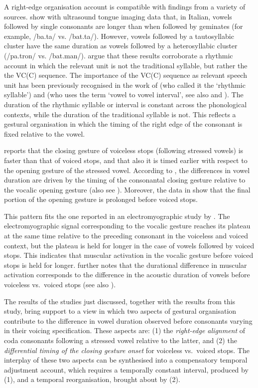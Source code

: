 \documentclass[preprint]{JASAnew}
\begin{document}
A right-edge organisation account is compatible with findings from a
variety of sources. \citet{celata2018} show with ultrasound tongue
imaging data that, in Italian, vowels followed by single consonants are
longer than when followed by geminates (for example, /ba.ta/ vs.
/bat.ta/). However, vowels followed by a tautosyllabic cluster have the
same duration as vowels followed by a heterosyllabic cluster (/pa.tron/
vs. /bat.man/). \citet{celata2018} argue that these results corroborate
a rhythmic account in which the relevant unit is not the traditional
syllable, but rather the the VC(C) sequence. The importance of the VC(C)
sequence as relevant speech unit has been previously recognised in the
work of \citet{farnetani1986} (who called it the `rhythmic syllable')
and \citet{steriade2012} (who uses the term `vowel to vowel interval',
see also \citealt{hirsch2014} and \citealt{lunden2017}). The duration of
the rhythmic syllable or interval is constant across the phonological
contexts, while the duration of the traditional syllable is not. This
reflects a gestural organisation in which the timing of the right edge
of the consonant is fixed relative to the vowel.

\citet{de-jong1991} reports that the closing gesture of voiceless stops
(following stressed vowels) is faster than that of voiced stops, and
that also it is timed earlier with respect to the opening gesture of the
stressed vowel. According to \citet{de-jong1991}, the differences in
vowel duration are driven by the timing of the consonantal closing
gesture relative to the vocalic opening gesture (also see
\citealt{hertrich1997}). Moreover, the data in \citet{de-jong1991} show
that the final portion of the opening gesture is prolonged before voiced
stops.

This pattern fits the one reported in an electromyographic study by
\citet{raphael1975}. The electromyographic signal corresponding to the
vocalic gesture reaches its plateau at the same time relative to the
preceding consonant in the voiceless and voiced context, but the plateau
is held for longer in the case of vowels followed by voiced stops. This
indicates that muscular activation in the vocalic gesture before voiced
stops is held for longer. \citet{raphael1975} further notes that the
durational difference in muscular activation corresponds to the
difference in the acoustic duration of vowels before voiceless
vs.~voiced stops (see also \citealt{warren2005}).

The results of the studies just discussed, together with the results
from this study, bring support to a view in which two aspects of
gestural organisation contribute to the difference in vowel duration
observed before consonants varying in their voicing specification. These
aspects are: (1) the \emph{right-edge alignment} of coda consonants
following a stressed vowel relative to the latter, and (2) the
\emph{differential timing of the closing gesture onset} for voiceless
vs.~voiced stops. The interplay of these two aspects can be synthesised
into a compensatory temporal adjustment account, which requires a
temporally constant interval, produced by (1), and a temporal
reorganisation, brought about by (2).
\end{document}
